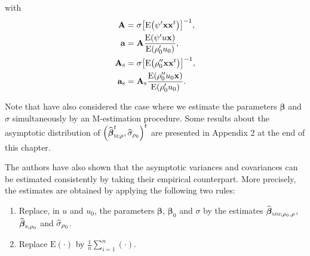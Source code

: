 with
\begin{align}
\mathbf{A}  &  =\sigma\left[  \mathrm{E}\left(  \psi^{\prime}\mathbf{xx}%
^{t}\right)  \right]  ^{-1},\label{eq:A}\\
\mathbf{a}  &  =\mathbf{A}\frac{\mathrm{E}\left(  \psi^{\prime}u\stvec{x}%
\right)  }{\mathrm{E}\left(  \rho_{0}^{\prime}u_{0}\right)  },\label{eq:a}\\
\mathbf{A}_{\stsc{S}}  &  =\sigma\left[  \mathrm{E}\left(  \rho_{0}%
^{\prime\prime}\mathbf{xx}^{t}\right)  \right]  ^{-1},\label{eq:A_S}\\
\mathbf{a}_{\stsc{S}}  &  =\mathbf{A}_{\stsc{S}}\frac{\mathrm{E}\left(
\rho_{0}^{\prime\prime}u_{0}\stvec{x}\right)  }{\mathrm{E}\left(  \rho
_{0}^{\prime}u_{0}\right)  }. \label{eq:a_S}%
\end{align}


\begin{stremark}
\bigskip Note that \citet{Croux:2003} have also considered the case where we
estimate the parameters $\boldsymbol\beta$ and $\sigma$ simultaneously by an
M-estimation procedure. Some results about the asymptotic distribution of
$\left(  \sthat{\boldsymbol\beta}_{\stsc{M};\rho}^{t},\sthat{\sigma
}_{\rho_{0}}\right)  ^{t}$ are presented in Appendix 2 at the end of this chapter.
\end{stremark}

The authors have also shown that the asymptotic variances and covariances can
be estimated consistently by taking their empirical counterpart. More
precisely, the estimates are obtained by applying the following two rules:

\begin{enumerate}
\item Replace, in $u$ and $u_{0}$, the parameters $\boldsymbol\beta$,
$\boldsymbol\beta_{0}$ and $\sigma$ by the estimates $\widehat
{\boldsymbol\beta}_{\stsc{MM};\rho_{0},\rho}$, $\sthat{\boldsymbol{\beta
}}_{\stsc{S};\rho_{0}}$ and $\widehat{\sigma}_{\rho_{0}}$.

\item Replace $\mathrm{E}\left(  \cdot\right)  $ by $\frac{1}{n}\sum_{i=1}%
^{n}\left(  \cdot\right)  $.
\end{enumerate}

